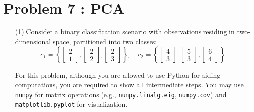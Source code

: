 \documentclass[11pt,addpoints,answers]{exam}
\begin{document}
	\section*{Problem 7 : PCA}
	
	\begin{enumerate}
		\item[(1)] Consider a binary classification scenario with observations residing in two-dimensional space, partitioned into two classes:  
		\[
		c_{1}=\left\{ \begin{bmatrix} 2 \\ 1 \end{bmatrix}, \begin{bmatrix} 2 \\ 2 \end{bmatrix}, \begin{bmatrix} 2 \\ 3 \end{bmatrix} \right\}, \quad c_{2}=\left\{ \begin{bmatrix} 4 \\ 3 \end{bmatrix}, \begin{bmatrix} 5 \\ 3 \end{bmatrix}, \begin{bmatrix} 6 \\ 4 \end{bmatrix} \right\}
		\]
		
		For this problem, although you are allowed to use Python for aiding computations, you are required to show all intermediate steps. You may use \texttt{numpy} for matrix operations (e.g., \texttt{numpy.linalg.eig}, \texttt{numpy.cov}) and \texttt{matplotlib.pyplot} for visualization.
		
		

\end{enumerate}
\end{document}
